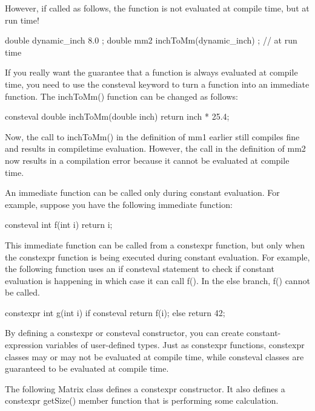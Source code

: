 However, if called as follows, the function is not evaluated at compile time, but at run time!

\begin{cpp}
double dynamic_inch { 8.0 };
double mm2 { inchToMm(dynamic_inch) }; // at run time
\end{cpp}

If you really want the guarantee that a function is always evaluated at compile time, you need to use the consteval keyword to turn a function into an immediate function. The inchToMm() function can be changed as follows:

\begin{cpp}
consteval double inchToMm(double inch) { return inch * 25.4; }
\end{cpp}

Now, the call to inchToMm() in the definition of mm1 earlier still compiles fine and results in compiletime evaluation. However, the call in the definition of mm2 now results in a compilation error because it cannot be evaluated at compile time.

An immediate function can be called only during constant evaluation. For example, suppose you have the following immediate function:

\begin{cpp}
consteval int f(int i) { return i; }
\end{cpp}


This immediate function can be called from a constexpr function, but only when the constexpr function is being executed during constant evaluation. For example, the following function uses an if consteval statement to check if constant evaluation is happening in which case it can call f(). In the else branch, f() cannot be called.

\begin{cpp}
constexpr int g(int i)
{
    if consteval { return f(i); }
    else { return 42; }
}
\end{cpp}


By defining a constexpr or consteval constructor, you can create constant-expression variables of user-defined types. Just as constexpr functions, constexpr classes may or may not be evaluated at compile time, while consteval classes are guaranteed to be evaluated at compile time.

The following Matrix class defines a constexpr constructor. It also defines a constexpr getSize() member function that is performing some calculation.

